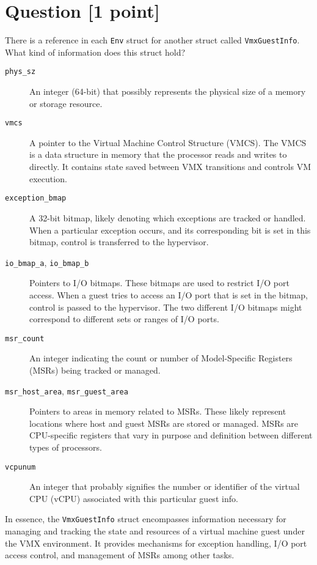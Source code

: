 \documentclass[11pt]{article}
\begin{document}
\section{Question [1 point]}

There is a reference in each \texttt{Env} struct for another struct called \texttt{VmxGuestInfo}. What kind of information does this struct hold?

\begin{solution}

\begin{description}
    \item[\texttt{phys\_sz}] An integer (64-bit) that possibly represents the physical size of a memory or storage resource.
    
    \item[\texttt{vmcs}] A pointer to the Virtual Machine Control Structure (VMCS). The VMCS is a data structure in memory that the processor reads and writes to directly. It contains state saved between VMX transitions and controls VM execution.
    
    \item[\texttt{exception\_bmap}] A 32-bit bitmap, likely denoting which exceptions are tracked or handled. When a particular exception occurs, and its corresponding bit is set in this bitmap, control is transferred to the hypervisor.
    
    \item[\texttt{io\_bmap\_a}, \texttt{io\_bmap\_b}] Pointers to I/O bitmaps. These bitmaps are used to restrict I/O port access. When a guest tries to access an I/O port that is set in the bitmap, control is passed to the hypervisor. The two different I/O bitmaps might correspond to different sets or ranges of I/O ports.
    
    \item[\texttt{msr\_count}] An integer indicating the count or number of Model-Specific Registers (MSRs) being tracked or managed.
    
    \item[\texttt{msr\_host\_area}, \texttt{msr\_guest\_area}] Pointers to areas in memory related to MSRs. These likely represent locations where host and guest MSRs are stored or managed. MSRs are CPU-specific registers that vary in purpose and definition between different types of processors.
    
    \item[\texttt{vcpunum}] An integer that probably signifies the number or identifier of the virtual CPU (vCPU) associated with this particular guest info.
\end{description}

In essence, the \texttt{VmxGuestInfo} struct encompasses information necessary for managing and tracking the state and resources of a virtual machine guest under the VMX environment. It provides mechanisms for exception handling, I/O port access control, and management of MSRs among other tasks.

\end{solution}
\end{document}
